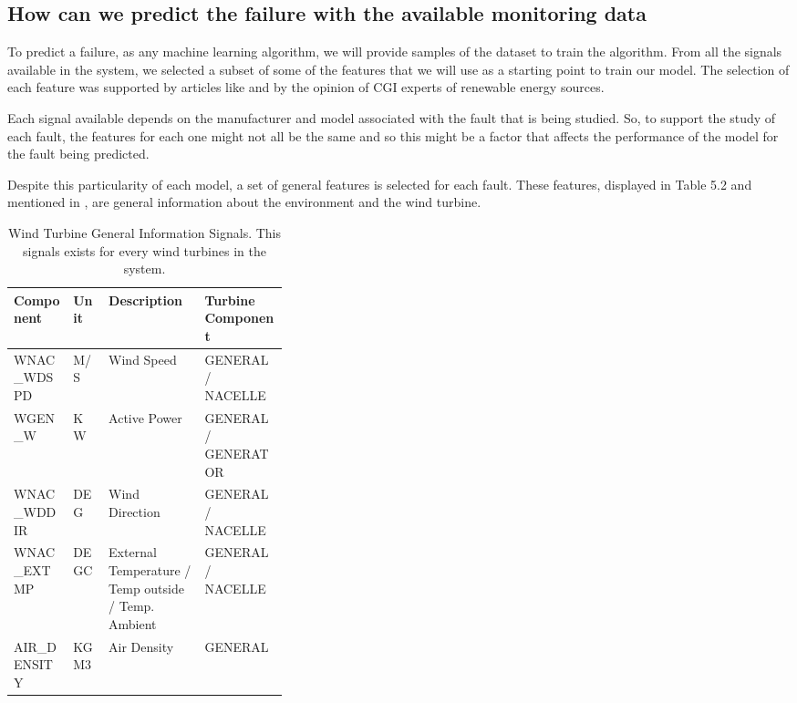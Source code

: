 
\subsection{How can we predict the failure with the available monitoring data} 
\label{sub:if_you_use_this_template} 


To predict a failure, as any machine learning algorithm, we will provide samples of the dataset to train the algorithm. From all the signals available in the system, we selected a subset of some of the features that we will use as a starting point to train our model. The selection of each feature was supported by articles like \cite{OLD_41_WIND} and by the opinion of CGI experts of renewable energy sources.

Each signal available depends on the manufacturer and model associated with the fault that is being studied. So, to support the study of each fault, the features for each one might not all be the same and so this might be a factor that affects the performance of the model for the fault being predicted.

Despite this particularity of each model, a set of general features is selected for each fault. These features, displayed in Table 5.2 and mentioned in \cite{OLD_41_WIND}, are general information about the environment and the wind turbine.

\begin{table}[!ht]
    \centering
    \begin{tabular}{|l|l|p{0.35\linewidth}|l|}
    \hline
        Component & Unit & Description & Turbine Component \\ \hline
        WNAC\_WDSPD & M/S & Wind Speed & GENERAL / NACELLE \\ \hline
        WGEN\_W & KW & Active Power & GENERAL / GENERATOR \\ \hline
        WNAC\_WDDIR & DEG & Wind Direction & GENERAL / NACELLE \\ \hline
        WNAC\_EXTMP & DEGC & External Temperature / Temp outside / Temp. Ambient & GENERAL / NACELLE \\ \hline
        AIR\_DENSITY & KGM3 & Air Density & GENERAL \\ \hline
    \end{tabular}
    \caption{Wind Turbine General Information Signals. This signals exists for every wind turbines in the system.}
    \label{GeneralSignals}
\end{table}

